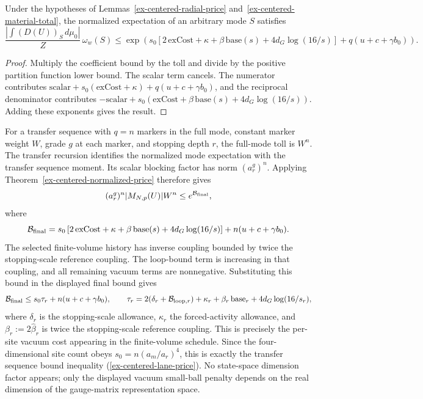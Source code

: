 \begin{theorem}\label{ex-centered-normalized-price}
Under the hypotheses of Lemmas~\ref{ex-centered-radial-price} and~\ref{ex-centered-material-total}, the normalized expectation of an arbitrary mode $S$ satisfies
\[
 \frac{\left|\int(D(U))_S\,d\mu_0\right|}{Z}\,
 \omega_w(S)
 \leq \exp\!\left(s_0\left[2\,\mathrm{exCost}+\kappa+\beta\,\mathrm{base}(s)
                       +4d_G\log(16/s)\right]+q(u+c+\gamma b_0)\right).
 \label{ex-centered-final-bill}
\]
\end{theorem}
\begin{proof}
Multiply the coefficient bound by the toll and divide by the positive partition function lower bound. The scalar term cancels. The numerator contributes $\mathrm{scalar}+s_0(\mathrm{exCost}+\kappa)+q(u+c+\gamma b_0)$, and the reciprocal denominator contributes $-\mathrm{scalar}+s_0(\mathrm{exCost}+\beta\,\mathrm{base}(s)+4d_G\log(16/s))$. Adding these exponents gives the result.
\end{proof}

For a transfer sequence with $q=n$ markers in the full mode, constant marker weight $W$, grade $g$ at each marker, and stopping depth $r$, the full-mode toll is $W^n$. The transfer recursion identifies the normalized mode expectation with the transfer sequence moment. Its scalar blocking factor has norm $(a_r^g)^n$. Applying Theorem~\ref{ex-centered-normalized-price} therefore gives
\[
 (a_r^g)^n|M_{N,p}(U)|W^n\leq e^{\mathcal B_{\rm final}},
\]
where
\[
 \mathcal B_{\rm final}=s_0\left[2\,\mathrm{exCost}+\kappa+\beta\,\mathrm{base}(s)+4d_G\log(16/s)\right]
                       +n(u+c+\gamma b_0).
\]
The selected finite-volume history has inverse coupling bounded by twice the stopping-scale reference coupling. The loop-bound term is increasing in that coupling, and all remaining vacuum terms are nonnegative. Substituting this bound in the displayed final bound gives
\[
 \mathcal B_{\rm final}\leq s_0\tau_r+n(u+c+\gamma b_0),\qquad
 \tau_r=2(\delta_r+\mathcal B_{{\rm loop},r})+\kappa_r
       +\beta_r\,\mathrm{base}_r+4d_G\log(16/s_r),
\]
where $\delta_r$ is the stopping-scale allowance, $\kappa_r$ the forced-activity allowance, and $\beta_r:=2\widehat\beta_r$ is twice the stopping-scale reference coupling. This is precisely the per-site vacuum cost appearing in the finite-volume schedule. Since the four-dimensional site count obeys $s_0=n(a_m/a_r)^4$, this is exactly the transfer sequence bound inequality (\ref{ex-centered-lane-price}). No state-space dimension factor appears; only the displayed vacuum small-ball penalty depends on the real dimension of the gauge-matrix representation space.

